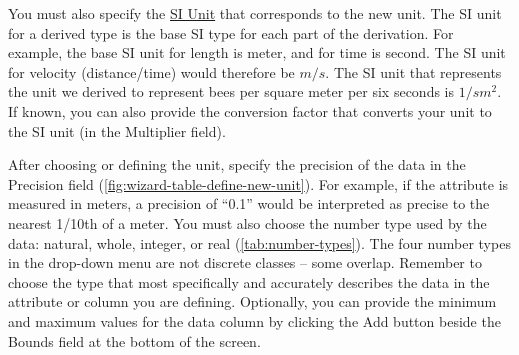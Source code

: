 \begin{shaded}
  You must also specify the \href{http://en.wikipedia.org/wiki/SI} {SI
  Unit} that corresponds to the new unit. The SI unit for a derived type
  is the base SI type for each part of the derivation.  For example, the
  base SI unit for length is meter, and for time is second.  The SI unit
  for velocity (distance/time) would therefore be $m/s$.  The SI unit that
  represents the unit we derived to represent bees per square meter per
  six seconds is $1/sm^2$. If known, you can also provide the
  conversion factor that converts your unit to the SI unit (in the
  Multiplier field).
\end{shaded}

After choosing or defining the unit, specify the precision of the data
in the Precision field (\autoref{fig:wizard-table-define-new-unit}). For
example, if the attribute is measured in meters, a precision of ``0.1''
would be interpreted as precise to the nearest 1/10th of a meter. You
must also choose the number type used by the data: natural, whole,
integer, or real (\autoref{tab:number-types}). The four number types in
the drop-down menu are not discrete classes – some overlap. Remember to
choose the type that most specifically and accurately describes the data
in the attribute or column you are defining. Optionally, you can provide
the minimum and maximum values for the data column by clicking the Add
button beside the Bounds field at the bottom of the screen. 

